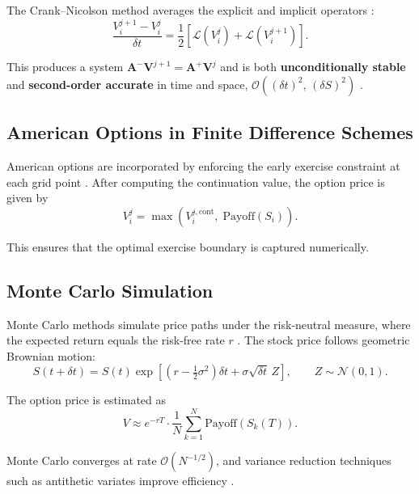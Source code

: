 \documentclass[12pt]{article}
\begin{document}
The Crank--Nicolson method averages the explicit and implicit operators
\cite{crank1947}:
\begin{equation}
  \frac{V_i^{j+1} - V_i^j}{\delta t}
  = \frac{1}{2}\left[\mathcal{L}(V_i^j) + \mathcal{L}(V_i^{j+1})\right].
\end{equation}

This produces a system
$\mathbf{A}^{-}\mathbf{V}^{j+1} = \mathbf{A}^{+}\mathbf{V}^j$ and is both
\textbf{unconditionally stable} and \textbf{second-order accurate} in time and space,
$\mathcal{O}((\delta t)^2,\,(\delta S)^2)$ \cite{seydel2012,wilmott2006}.

\subsection{American Options in Finite Difference Schemes}

American options are incorporated by enforcing the early exercise constraint at each
grid point \cite{wilmott2006}. After computing the continuation value, the option
price is given by
\begin{equation}
  V_i^j = \max\left(V_i^{j,\text{cont}},\; \text{Payoff}(S_i)\right).
\end{equation}

This ensures that the optimal exercise boundary is captured numerically.

\subsection{Monte Carlo Simulation}

Monte Carlo methods simulate price paths under the risk-neutral measure, where the
expected return equals the risk-free rate $r$ \cite{glasserman2004}. The stock price
follows geometric Brownian motion:
\begin{equation}
  S(t + \delta t) = S(t)\exp\left[\left(r - \tfrac{1}{2}\sigma^2\right)\delta t
    + \sigma\sqrt{\delta t}\, Z\right], \qquad Z \sim \mathcal{N}(0,1).
\end{equation}

The option price is estimated as
\begin{equation}
  V \approx e^{-rT} \cdot \frac{1}{N}\sum_{k=1}^N \text{Payoff}\left(S_k(T)\right).
\end{equation}

Monte Carlo converges at rate $\mathcal{O}(N^{-1/2})$, and variance reduction
techniques such as antithetic variates improve efficiency \cite{glasserman2004}.
\newpage
\end{document}
